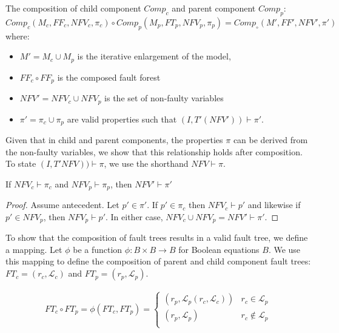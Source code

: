 \begin{definition}
The composition of child component $\mathit{Comp}_c$ and parent component $\mathit{Comp}_p$:
$Comp_c(M_c, \mathit{FF}_c, \mathit{NFV}_c, \pi_c) \circ Comp_p(M_p, \mathit{FT}_p, \mathit{NFV}_p, \pi_p) = Comp_\circ(M', \mathit{FF}', \mathit{NFV}', \pi')$ where:
\begin{itemize}[label=\textbullet]
\item $M' = M_c \cup M_p$ is the iterative enlargement of the model,
\item $\mathit{FF}_c \circ \mathit{FF}_p$ is the composed fault forest
\item $\mathit{NFV}' = \mathit{NFV}_c \cup \mathit{NFV}_p$ is the set of non-faulty variables
\item $\pi' = \pi_c \cup \pi_p$ are valid properties such that $(I, T'(\mathit{NFV}')) \vdash \pi'$.
\end{itemize}
\end{definition}


Given that in child and parent components, the properties $\pi$ can be derived from the non-faulty variables, we show that this relationship holds after composition. To state $(I, T'\mathit{NFV})) \vdash \pi$, we use the shorthand $\mathit{NFV} \vdash \pi$. 

\begin{theorem} If $\mathit{NFV}_c \vdash \pi_c$ and $\mathit{NFV}_p \vdash \pi_p$, then $\mathit{NFV}' \vdash \pi'$
\begin{proof}
Assume antecedent. Let $p' \in \pi'$. If $p' \in \pi_c$ then $\mathit{NFV}_c \vdash p'$ and likewise if $p' \in \mathit{NFV}_p$, then $\mathit{NFV}_p \vdash p'$. In either case, $\mathit{NFV}_c \cup \mathit{NFV}_p = \mathit{NFV}' \vdash \pi'$.
\end{proof}
\end{theorem} 

To show that the composition of fault trees results in a valid fault tree, we define a mapping. Let $\phi$ be a function $\phi : B \times B \rightarrow B$ for Boolean equations $B$. We use this mapping to define the composition of parent and child component fault trees: $\mathit{FT}_c = (r_c, \mathcal{L}_c)$ and $\mathit{FT}_p = (r_p, \mathcal{L}_p)$.

\begin{gather}
\mathit{FT}_c \circ \mathit{FT}_p = \phi(\mathit{FT}_c, \mathit{FT}_p) =\begin{cases} 
      (r_p, \mathcal{L}_p(r_c, \mathcal{L}_c)) & r_c \in \mathcal{L}_p \\
      (r_p, \mathcal{L}_p) & r_c \not\in \mathcal{L}_p \\
   \end{cases}
\label{eq:phi}
\end{gather}

